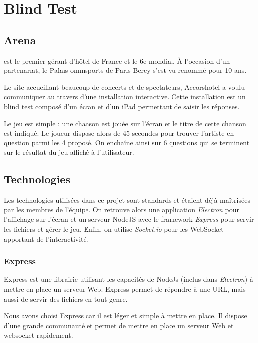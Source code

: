 \section{Blind Test \aha}

\subsection{\ah Arena}

\ah est le premier gérant d'hôtel de France et le 6e mondial.
À l'occasion d'un partenariat, le Palais omnisports de Paris-Bercy s'est vu renommé \aha pour 10 ans.

Le site accueillant beaucoup de concerts et de spectateurs, Accorshotel a voulu communiquer au travers d'une installation interactive.
Cette installation est un blind test composé d'un écran et d'un iPad permettant de saisir les réponses.

Le jeu est simple : une chanson est jouée sur l'écran et le titre de cette chanson est indiqué.
Le joueur dispose alors de 45 secondes pour trouver l'artiste en question parmi les 4 proposé.
On enchaîne ainsi sur 6 questions qui se terminent sur le résultat du jeu affiché à l'utilisateur.

\subsection{Technologies}

Les technologies utilisées dans ce projet sont standards et étaient déjà maîtrisées par les membres de l'équipe.
On retrouve alors une application \emph{Electron} pour l'affichage sur l'écran et un serveur NodeJS avec le framework \emph{Express} pour servir les fichiers et gérer le jeu.
Enfin, on utilise \emph{Socket.io} pour les WebSocket apportant de l'interactivité.

\subsubsection{Express}

Express est une librairie utilisant les capacités de NodeJs (inclus dans \emph{Electron}) à mettre en place un serveur Web.
Express permet de répondre à une URL, mais aussi de servir des fichiers en tout genre.

Nous avons choisi Express car il est léger et simple à mettre en place.
Il dispose d'une grande communauté et permet de mettre en place un serveur Web et websocket rapidement.

